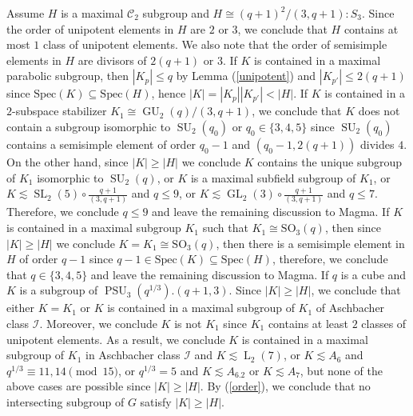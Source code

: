 \documentclass[12pt,reqno]{amsart}
\newcommand{\GL}{\operatorname{GL}}
\newcommand{\SL}{\operatorname{SL}}
\newcommand{\PSU}{\operatorname{PSU}}
\newcommand{\LL}{\operatorname{L}}
\newcommand{\SU}{\operatorname{SU}}
\newcommand{\GU}{\operatorname{GU}}
\theoremstyle{plain}
\theoremstyle{definition}
\begin{document}
  Assume $H$ is a maximal $\mathcal{C}_2$ subgroup and $H\cong (q+1)^2/(3,q+1){:}S_3$.
  Since the order of unipotent elements in $H$ are $2$ or $3$, we conclude that $H$ contains at most $1$ class of unipotent elements. 
  We also note that the order of semisimple elements in $H$ are divisors of $2(q+1)$ or $3$.
  If $K$ is contained in a maximal parabolic subgroup, then $|K_p|\le q$ by Lemma (\ref{unipotent}) and $|K_{p'}|\le 2(q+1)$ since $\mathrm{Spec}(K)\subseteq \mathrm{Spec}(H)$, hence $|K|=|K_{p}||K_{p'}|<|H|$.
  If $K$ is contained in a $2$-subspace stabilizer $K_1\cong \GU_2(q)/(3,q+1)$, we conclude that $K$ does not contain a subgroup isomorphic to $\SU_2(q_0)$ or $q_0\in \{3,4,5\}$ since $\SU_2(q_0)$ contains a semisimple element of order $q_0-1$ and $(q_0-1,2(q+1))$ divides $4$. 
  On the other hand, since $|K|\ge |H|$ we conclude $K$ contains the unique subgroup of $K_1$ isomorphic to $\SU_2(q)$, or $K$ is a maximal subfield subgroup of $K_1$, or $K\lesssim \SL_2(5)\circ \frac{q+1}{(3,q+1)}$ and $q\le 9$, or $K\lesssim \GL_2(3)\circ \frac{q+1}{(3,q+1)}$ and $q\le 7$. 
  Therefore, we conclude $q\le 9$ and leave the remaining discussion to Magma. 
  If $K$ is contained in a maximal subgroup $K_1$ such that $K_1\cong \mathrm{SO}_3(q)$, then since $|K|\ge |H|$ we conclude $K=K_1\cong \mathrm{SO}_3(q)$, then there is a semisimple element in $H$ of order $q-1$ since $q-1\in \mathrm{Spec}(K)\subseteq \mathrm{Spec}(H)$, therefore, we conclude that $q\in\{3,4,5\}$ and leave the remaining discussion to Magma. 
  If $q$ is a cube and $K$ is a subgroup of $\PSU_3(q^{1/3}).(q+1,3)$. Since $|K|\ge |H|$, we conclude that either $K=K_1$ or $K$ is contained in a maximal subgroup of $K_1$ of Aschbacher class $\mathcal{I}$. 
  Moreover, we conclude $K$ is not $K_1$ since $K_1$ contains at least $2$ classes of unipotent elements. 
  As a result, we conclude $K$ is contained in a maximal subgroup of $K_1$ in Aschbacher class $\mathcal{I}$ and  $K\lesssim \LL_2(7)$, or $K \lesssim A_6$ and $q^{1/3}\equiv 11, 14  \pmod {15}$, or $q^{1/3}=5$ and $K\lesssim  A_6.2$ or $K\lesssim A_7$, but none of the above cases are possible since $|K|\ge |H|$.
  By (\ref{order}), we conclude that no intersecting subgroup of $G$ satisfy $|K|\ge |H|$.
  
\end{document}
